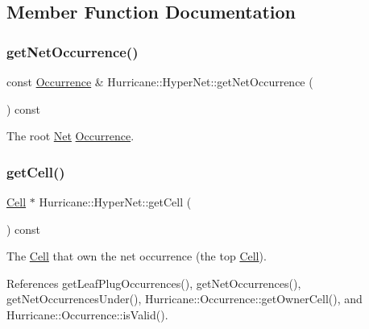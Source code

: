 \subsection{Member Function Documentation}
\mbox{\label{classHurricane_1_1HyperNet_a327eab6dda243836becde745bfc53efa}} 
\subsubsection{\texorpdfstring{get\+Net\+Occurrence()}{getNetOccurrence()}}
{\footnotesize\ttfamily const \hyperlink{classHurricane_1_1Occurrence}{Occurrence} \& Hurricane\+::\+Hyper\+Net\+::get\+Net\+Occurrence (\begin{DoxyParamCaption}{ }\end{DoxyParamCaption}) const\hspace{0.3cm}{\ttfamily [inline]}}

The root \hyperlink{classHurricane_1_1Net}{Net} \hyperlink{classHurricane_1_1Occurrence}{Occurrence}. \mbox{\label{classHurricane_1_1HyperNet_a5a818c5887d1d8dd2e0a59e8a57c02d7}} 
\subsubsection{\texorpdfstring{get\+Cell()}{getCell()}}
{\footnotesize\ttfamily \hyperlink{classHurricane_1_1Cell}{Cell} $\ast$ Hurricane\+::\+Hyper\+Net\+::get\+Cell (\begin{DoxyParamCaption}{ }\end{DoxyParamCaption}) const\hspace{0.3cm}{\ttfamily [inline]}}

The \hyperlink{classHurricane_1_1Cell}{Cell} that own the net occurrence (the top \hyperlink{classHurricane_1_1Cell}{Cell}). 

References get\+Leaf\+Plug\+Occurrences(), get\+Net\+Occurrences(), get\+Net\+Occurrences\+Under(), Hurricane\+::\+Occurrence\+::get\+Owner\+Cell(), and Hurricane\+::\+Occurrence\+::is\+Valid().

\mbox{\label{classHurricane_1_1HyperNet_a02180e650b1f2e5b87bf4774a5799ebc}} 
